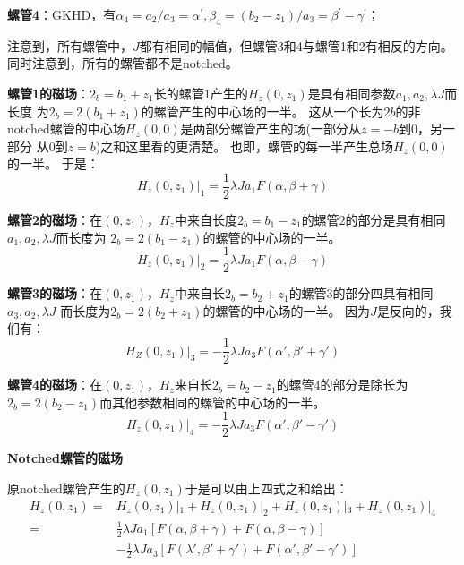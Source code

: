 \textbf{螺管4}：GKHD，有$\alpha_4=a_2/a_3=\alpha^\prime,\beta_4=(b_2-z_1)/a_3=\beta^\prime-\gamma^\prime$；

注意到，所有螺管中，$J$都有相同的幅值，但螺管3和4与螺管1和2有相反的方向。同时注意到，所有的螺管都不是notched。

\textbf{螺管1的磁场}：$2_b=b_1+z_1$长的螺管1产生的$H_z(0, z_1)$是具有相同参数$a_1, a_2,\lambda J$而长度
为$2_b = 2(b_1+z_1)$的螺管产生的中心场的一半。
这从一个长为$2b$的非notched螺管的中心场$H_z(0, 0)$是两部分螺管产生的场(一部分从$z=−b$到$0$，另一部分
从$0$到$z=b$)之和这里看的更清楚。
也即，螺管的每一半产生总场$H_z(0, 0)$的一半。 于是：
\begin{equation*}
H_{z}(0,z_{1})|_{1}=\frac{1}{2}\lambda Ja_{1}F(\alpha,\beta+\gamma)\tag{S7.1}
\end{equation*}

\textbf{螺管2的磁场}：在$(0, z_1)$，$H_z$中来自长度$2_b = b_1−z_1$的螺管2的部分是具有相同$a_1, a_2,\lambda J$而长度为
$2_b = 2(b_1−z_1)$的螺管的中心场的一半。
\begin{equation}
H_{z}(0,z_{1})|_{2}=\frac{1}{2}\lambda Ja_{1}F(\alpha,\beta-\gamma)\tag{S7.2}
\end{equation}

\textbf{螺管3的磁场}：在$(0, z_1)$，$H_z$中来自长$2_b=b_2+z_1$的螺管3的部分四具有相同$a_3, a_2,\lambda J$
而长度为$2_b=2(b_2+z_1)$的螺管的中心场的一半。
因为$J$是反向的，我们有：
\begin{equation}
H_{Z}(0,z_{1})|_{3}=-\frac{1}{2}\lambda Ja_{3}F(\alpha',\beta'+\gamma')\tag{S7.3}
\end{equation}

\textbf{螺管4的磁场}：在$(0, z_1)$，$H_z$来自长$2_b = b_2−z_1$的螺管4的部分是除长为$2_b = 2(b_2−z_1)$而其他参数相同的螺管的中心场的一半。
\begin{equation}
H_{z}(0,z_{1})|_{4}=-\frac{1}{2}\lambda Ja_{3}F(\alpha',\beta'-\gamma')\tag{S7.4}
\end{equation}

\textbf{Notched螺管的磁场}

原notched螺管产生的$H_z(0,z_1)$于是可以由上四式之和给出：
\begin{equation*}%
\begin{split}
 H_{z}(0,z_{1}) =&H_{z}(0,z_{1})|_{1}+H_{z}(0,z_{1})|_{2}+H_{z}(0,z_{1})|_{3}+H_{z}(0,z_{1})|_{4} \\
=&\frac{1}{2}\lambda J a_{1}[F(\alpha,\beta+\gamma)+F(\alpha,\beta-\gamma)] \\%
&-\frac{1}{2}\lambda J a_{3}[F(\lambda',\beta'+\gamma')+F(\alpha',\beta'-\gamma')]
\end{split} \tag{3.127}
\end{equation*}



